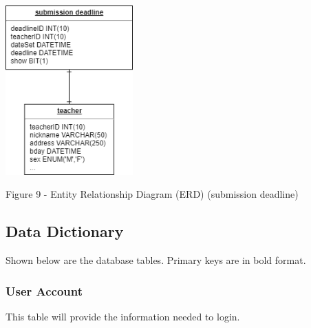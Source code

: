 \documentclass[11pt,a4paper,titlepage]{article}
\begin{document}
\vspace{1cm}
\begin{center}
    \includegraphics[height=6.5cm]{Submission-Deadline.png}
\end{center}
\vspace{1cm}
\begin{center}
    Figure 9 - Entity Relationship Diagram (ERD) (submission deadline)
\end{center}


\newpage

\subsection{Data Dictionary}

Shown below are the database tables. Primary keys are in bold format.

\subsubsection{User Account}

This table will provide the information needed to login.
\end{document}
